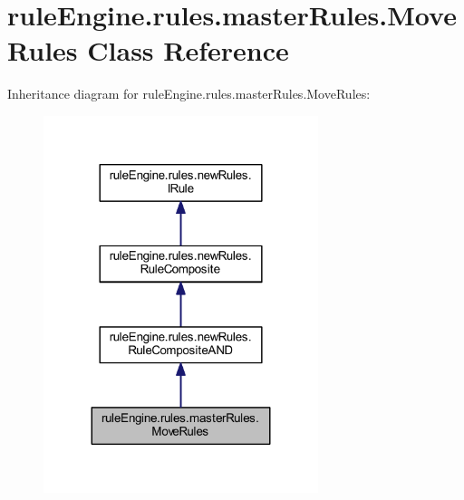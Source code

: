\hypertarget{classrule_engine_1_1rules_1_1master_rules_1_1_move_rules}{}\section{rule\+Engine.\+rules.\+master\+Rules.\+Move\+Rules Class Reference}
\label{classrule_engine_1_1rules_1_1master_rules_1_1_move_rules}


Inheritance diagram for rule\+Engine.\+rules.\+master\+Rules.\+Move\+Rules\+:
\nopagebreak
\begin{figure}[H]
\begin{center}
\leavevmode
\includegraphics[width=227pt]{classrule_engine_1_1rules_1_1master_rules_1_1_move_rules__inherit__graph}
\end{center}
\end{figure}


